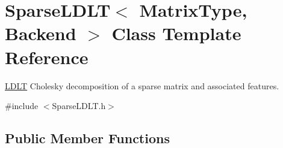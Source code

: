 \hypertarget{class_sparse_l_d_l_t}{\section{Sparse\-L\-D\-L\-T$<$ Matrix\-Type, Backend $>$ Class Template Reference}
\label{class_sparse_l_d_l_t}
}


\hyperlink{class_l_d_l_t}{L\-D\-L\-T} Cholesky decomposition of a sparse matrix and associated features.  




{\ttfamily \#include $<$Sparse\-L\-D\-L\-T.\-h$>$}

\subsection*{Public Member Functions}
